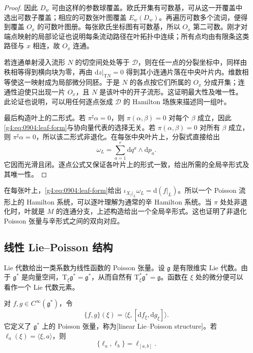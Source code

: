 \begin{proof}
	因此 \(D_w\) 可由这样的参数球覆盖。欧氏开集有可数基，可从这一开覆盖中选出可数子覆盖；相应的可数张叶图覆盖 \(E_w(D_w)\)。再遍历可数多个流词，便得到覆盖 \(O_x\) 的可数叶图册。每张欧氏坐标图有可数基，所以 \(O_x\) 第二可数。刚才对端点映射的局部论证也说明每条流动路径在叶拓扑中连续；所有点均由有限条这类路径与 \(x\) 相连，故 \(O_x\) 连通。

	若连通单射浸入流形 \(N\) 的切空间处处等于 \(\mathcal D\)，则在任一点的分裂坐标中，同样由秩相等得到横向块为零，再由 \(\mathrm{d}z|_{\mathrm{T}N}=0\) 得到其小连通片落在中央叶片内。维数相等使这一映射成为局部微分同胚。于是 \(N\) 的各点按它们所属的 \(O_x\) 分成开集；连通性迫使只出现一片 \(O_x\)，且 \(N\) 是该叶中的开子流形。这证明最大性及唯一性。此论证也说明，可以用任何逐点张成 \(\mathcal D\) 的 Hamilton 场族来描述同一组叶。

	最后构造叶上的二形式。若 \(\pi^\sharp\alpha=0\)，则 \(\pi(\alpha,\beta)=0\) 对每个 \(\beta\) 成立，因此\eqref{g4:eq:0904:leaf-form}与协向量代表的选择无关。若 \(\pi(\alpha,\beta)=0\) 对所有 \(\beta\) 成立，则 \(\pi^\sharp\alpha=0\)，所以该二形式非退化。在每张中央叶片上，分裂式直接给出
	\[
		\omega_L=\sum_{a=1}^r\mathrm{d}q^a\wedge\mathrm{d}p_a.
	\]
	它因而光滑且闭。逐点公式又保证各叶片上的形式一致，给出所需的全局辛形式及其唯一性。
\end{proof}

在每张叶上，\eqref{g4:eq:0904:leaf-form}给出 \(\iota_{X_f|_L}\omega_L=\mathrm{d}(f|_L)\)。所以一个 Poisson 流形上的 Hamilton 系统，可以逐叶理解为通常的辛 Hamilton 系统。当 \(\pi\) 处处非退化时，叶就是 \(M\) 的连通分支，上述构造给出一个全局辛形式。这也证明了非退化 Poisson 张量与辛形式之间的双向对应。

\subsection{线性 Lie–Poisson 结构}
\label{g4:subsec:0904:03}
Lie 代数给出一类系数为线性函数的 Poisson 张量。设 \(\mathfrak g\) 是有限维实 Lie 代数。由于 \(\mathfrak g^*\) 是向量空间，\(\mathrm{T}_\xi\mathfrak g^*=\mathfrak g^*\)，从而自然有 \(\mathrm{T}_\xi^*\mathfrak g^*=\mathfrak g\)。函数在 \(\xi\) 处的微分便可以看作一个 Lie 代数元素。

\begin{proposition}\label{g4:prop:0904:lie-poisson}
	对 \(f,g\in C^\infty(\mathfrak g^*)\)，令
	\begin{equation}\label{g4:eq:0904:lie-poisson}
		\{f,g\}(\xi)=\langle\xi,[\mathrm{d}f_\xi,\mathrm{d}g_\xi]\rangle.
	\end{equation}
	它定义了 \(\mathfrak g^*\) 上的 Poisson 张量，称为[linear Lie--Poisson structure]。若 \(\ell_a(\xi)=\langle\xi,a\rangle\)，则
	\[
		\{\ell_a,\ell_b\}=\ell_{[a,b]}.
	\]
\end{proposition}

